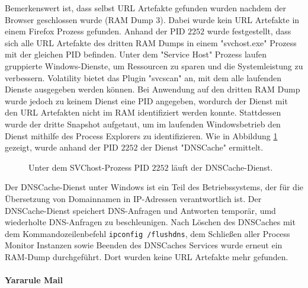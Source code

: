 Bemerkenswert ist, dass selbst URL Artefakte gefunden wurden nachdem der Browser geschlossen wurde (RAM Dump 3). Dabei wurde kein URL Artefakte in einem Firefox Prozess gefunden.
Anhand der PID $2252$ wurde festgestellt, dass sich alle URL Artefakte des dritten RAM Dumps in einem "svchost.exe" Prozess mit der gleichen PID befinden. Unter dem "Service Host" Prozess laufen gruppierte Windows-Dienste, um Ressourcen zu sparen und die Systemleistung zu verbessern.
Volatility bietet das Plugin "svcscan" an, mit dem alle laufenden Dienste ausgegeben werden können.
Bei Anwendung auf den dritten RAM Dump wurde jedoch zu keinem Dienst eine PID angegeben, wordurch der Dienst mit den URL Artefakten nicht im RAM identifiziert werden konnte. 
Stattdessen wurde der dritte Snapshot aufgetaut, um im laufenden Windowsbetrieb den Dienst mithilfe des Process Explorers zu identifizieren.
Wie in Abbildung \ref{chart:svchost-dnscache} gezeigt, wurde anhand der PID $2252$ der Dienst "DNSCache" ermittelt.
\begin{figure}[h!]
	\centerline{}
	\label{chart:svchost-dnscache}  
	\caption{Unter dem SVChost-Prozess PID $2252$ läuft der DNSCache-Dienst.}
\end{figure}
Der DNSCache-Dienst unter Windows ist ein Teil des Betriebssystems, der für die Übersetzung von Domainnamen in IP-Adressen verantwortlich ist. Der DNSCache-Dienst speichert DNS-Anfragen und Antworten temporär, umd wiederholte DNS-Anfragen zu beschleunigen.
Nach Löschen des DNSCaches mit dem Kommandozeilenbefehl \texttt{ipconfig /flushdns}, dem Schließen aller Process Monitor Instanzen sowie Beenden des DNSCaches Services wurde erneut ein RAM-Dump durchgeführt. Dort wurden keine URL Artefakte mehr gefunden.

\paragraph*{Yararule Mail}


